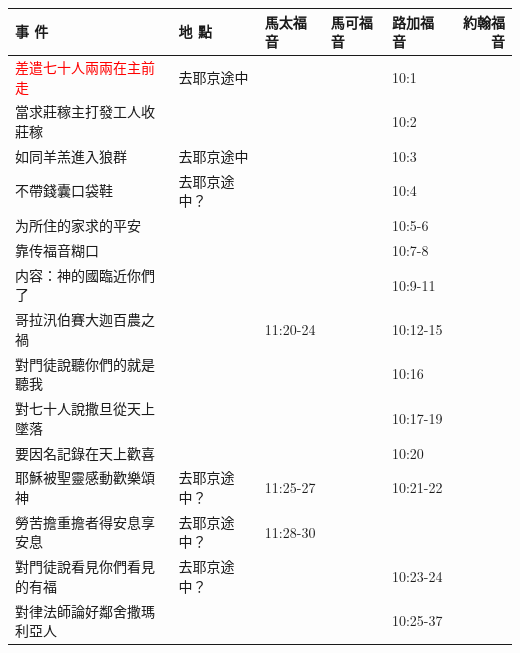 \begin{table}[H] \centering 
\begin{tabular}{p{13.07em}|l|l|l|p{5.285em}|r} \toprule
\textbf{事 件} & \multicolumn{1}{p{7.93em}|}{\textbf{地 點}} & \multicolumn{1}{p{5.285em}|}{\textbf{馬太福音}} & \multicolumn{1}{p{5.57em}|}{\textbf{馬可福音}} & \textbf{路加福音} & \multicolumn{1}{p{4.855em}}{\textbf{約翰福音}} \\\midrule 

\textcolor{red}{差遣七十人兩兩在主前走}& \multicolumn{1}{p{7.93em}|}{去耶京途中} & \multicolumn{1}{p{5.285em}|}{} &       & 10:1&  \\\midrule

當求莊稼主打發工人收莊稼& \multicolumn{1}{p{7.93em}|}{} & \multicolumn{1}{p{5.285em}|}{} &       & 10:2&  \\\midrule

如同羊羔進入狼群& \multicolumn{1}{p{7.93em}|}{去耶京途中} & \multicolumn{1}{p{5.285em}|}{} &       & 10:3&  \\\midrule
不帶錢囊口袋鞋& \multicolumn{1}{p{7.93em}|}{去耶京途中？} & \multicolumn{1}{p{5.285em}|}{} &       & 10:4&  \\\midrule
为所住的家求的平安& \multicolumn{1}{p{7.93em}|}{} & \multicolumn{1}{p{5.285em}|}{} &       & 10:5-6&  \\\midrule

靠传福音糊口& \multicolumn{1}{p{7.93em}|}{} & \multicolumn{1}{p{5.285em}|}{} &       & 10:7-8&  \\\midrule
内容：神的國臨近你們了& \multicolumn{1}{p{7.93em}|}{} & \multicolumn{1}{p{5.285em}|}{} &       & 10:9-11&  \\\midrule
哥拉汛伯賽大迦百農之禍& \multicolumn{1}{p{7.93em}|}{} & \multicolumn{1}{p{5.285em}|}{11:20-24} &       & 10:12-15&  \\\midrule
對門徒說聽你們的就是聽我& \multicolumn{1}{p{7.93em}|}{} & \multicolumn{1}{p{5.285em}|}{} &       & 10:16&  \\\midrule

對七十人說撒旦從天上墜落& \multicolumn{1}{p{7.93em}|}{} & \multicolumn{1}{p{5.285em}|}{} &       & 10:17-19 &  \\\midrule
要因名記錄在天上歡喜& \multicolumn{1}{p{7.93em}|}{} & \multicolumn{1}{p{5.285em}|}{} &       & 10:20 &  \\\midrule

耶穌被聖靈感動歡樂頌神 & \multicolumn{1}{p{7.93em}|}{去耶京途中？} & \multicolumn{1}{p{5.285em}|}{11:25-27} &       & 10:21-22 &  \\ \midrule
勞苦擔重擔者得安息享安息& \multicolumn{1}{p{7.93em}|}{去耶京途中？} & \multicolumn{1}{p{5.285em}|}{11:28-30} &       &  &  \\ \midrule
對門徒說看見你們看見的有福& \multicolumn{1}{p{7.93em}|}{去耶京途中？} & \multicolumn{1}{p{5.285em}|}{} &       & 10:23-24 &  \\ \midrule

對律法師論好鄰舍撒瑪利亞人&       &       &       & 10:25-37 &  \\ \midrule
\end{tabular}%
\end{table}%





